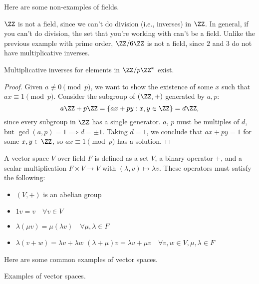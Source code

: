 \begin{example}
\exlabel

Here are some non-examples of fields. 
\end{example}

$\ZZ$ is not a field, since we can't do division (i.e., inverses) in $\ZZ$. In general, if you can't do division, the set that you're working with can't be a field. Unlike the previous example with prime order, $\ZZ/6\ZZ$ is not a field, since $2$ and $3$ do not have multiplicative inverses. 

\begin{theorem}
\lemlabel

Multiplicative inverses for elements in $\ZZ/p\ZZ^x$ exist.
\end{theorem}

\begin{proof}
Given $a\not\equiv 0\pmod{p}$, we want to show the existence of some $x$ such that $ax\equiv 1\pmod{p}$. Consider the subgroup of $(\ZZ, +)$ generated by $a,p$: 
\[a\ZZ+p\ZZ = \{ax+py: x,y\in \ZZ\} = d\ZZ,\]
since every subgroup in $\ZZ$ has a single generator. $a$, $p$ must be multiples of $d$, but $\gcd(a,p)=1\implies d=\pm 1$. Taking $d=1$, we conclude that $ax+py=1$ for some $x,y\in \ZZ$, so $ax\equiv 1\pmod{p}$ has a solution. 
\end{proof}

\begin{definition}

A \ac{vector space} $V$ over field $F$ is defined as a set $V$, a binary operator $+$, and a scalar multiplication $F\times V\rightarrow V$ with $(\lambda, v)\mapsto \lambda v$. These operators must satisfy the following: 
\begin{itemize}
    \item $(V,+)$ is an abelian group
    \item $1v=v\quad \forall v\in V$
    \item $\lambda(\mu v) = \mu(\lambda v)\quad \forall \mu, \lambda\in F$
    \item $\lambda(v+w) = \lambda v+\lambda w$\newline
    $(\lambda+\mu)v = \lambda v + \mu v\quad\forall v,w\in V, \mu, \lambda\in F$
\end{itemize}
\end{definition}

Here are some common examples of vector spaces. 

\begin{example}
\exlabel

Examples of vector spaces.
\end{example}

